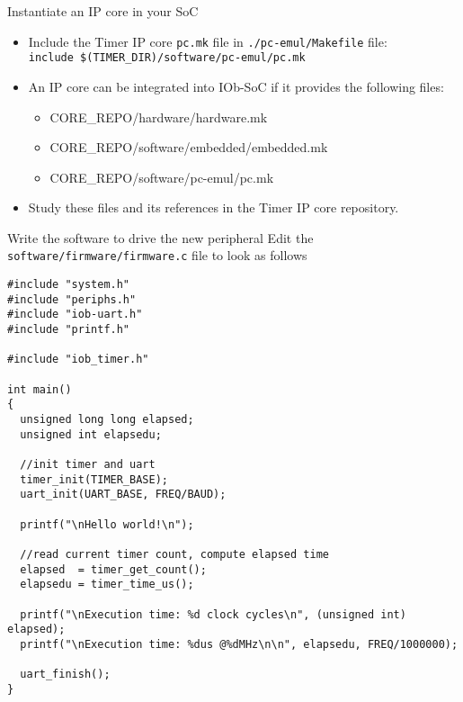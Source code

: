 \documentclass [xcolor=svgnames, t] {beamer}
\begin{document}
\begin{frame}{Instantiate an IP core in your SoC}
  \begin{itemize}
  \item Include the Timer IP core {\tt pc.mk} file in {\tt ./pc-emul/Makefile} file:\\
    {\tt \tiny include \$(TIMER\_DIR)/software/pc-emul/pc.mk}
  \item An IP core can be integrated into IOb-SoC if it provides the following files:
    \begin{itemize}
    \item CORE\_REPO/hardware/hardware.mk
    \item CORE\_REPO/software/embedded/embedded.mk
    \item CORE\_REPO/software/pc-emul/pc.mk
    \end{itemize}
  \item Study these files and its references in the Timer IP core repository.
  \end{itemize}
\end{frame}

\begin{frame}[fragile]{Write the software to drive the new peripheral}
  Edit the {\tt software/firmware/firmware.c} file to look as follows
  \begin{tiny}
    \begin{lstlisting}
#include "system.h"
#include "periphs.h"
#include "iob-uart.h"
#include "printf.h"

#include "iob_timer.h"

int main()
{
  unsigned long long elapsed;
  unsigned int elapsedu;

  //init timer and uart
  timer_init(TIMER_BASE);
  uart_init(UART_BASE, FREQ/BAUD);

  printf("\nHello world!\n");

  //read current timer count, compute elapsed time
  elapsed  = timer_get_count();
  elapsedu = timer_time_us();

  printf("\nExecution time: %d clock cycles\n", (unsigned int) elapsed);
  printf("\nExecution time: %dus @%dMHz\n\n", elapsedu, FREQ/1000000);

  uart_finish();
}
    \end{lstlisting}
  \end{tiny}
\end{frame}
\end{document}
